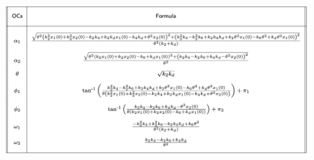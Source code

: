 \documentclass{bmcart}
\begin{document}
\begin{backmatter}
\begin{table}[]
\includegraphics[scale=0.45]{figures/Table_1.png}

\end{table}
\end{backmatter}
\end{document}
